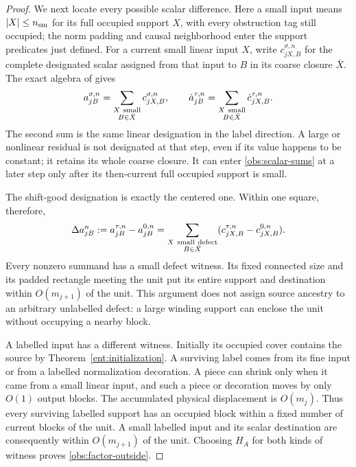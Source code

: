 \begin{proof}
We next locate every possible scalar difference.  Here a small
input means \(|X|\le n_{\rm sm}\) for its full occupied support
\(X\), with every obstruction tag still occupied; the norm padding
and causal neighborhood enter the support predicates just defined.
For a current small linear input \(X\), write
\(c_{jX,B}^{\sigma,n}\) for the complete designated scalar assigned
from that input to \(B\) in its coarse closure \(\bar X\).
The exact algebra of \cite[Proposition~4.8]{B} gives
\begin{equation}\label{obs:scalar-sums}
 a_{jB}^{\sigma,n}
       =\sum_{\substack{X\ {\rm small}\\B\in\bar X}}
                      c_{jX,B}^{\sigma,n},\qquad
 \dot a_{jB}^{\tau,n}
       =\sum_{\substack{X\ {\rm small}\\B\in\bar X}}
                      \dot c_{jX,B}^{\tau,n}.
\end{equation}
The second sum is the same linear designation in the label direction.
A large or nonlinear residual is not designated at that step, even
if its value happens to be constant; it retains its whole coarse
closure.  It can enter \eqref{obs:scalar-sums} at a later step only
after its then-current full occupied support is small.

The shift-good designation is exactly the centered one.  Within
one square, therefore,
\begin{equation}\label{obs:scalar-difference}
 \Delta a_{jB}^n:=a_{jB}^{\tau,n}-a_{jB}^{0,n}
   =\sum_{\substack{X\ {\rm small\ defect}\\B\in\bar X}}
             (c_{jX,B}^{\tau,n}-c_{jX,B}^{0,n}).
\end{equation}
Every nonzero summand has a small defect witness.  Its fixed connected
size and its padded rectangle meeting the unit put its entire support
and destination within \(O(m_{j+1})\) of the unit.  This argument
does not assign source ancestry to an arbitrary unlabelled defect:
a large winding support can enclose the unit without occupying a
nearby block.

A labelled input has a different witness.  Initially its occupied
cover contains the source by Theorem~\ref{ent:initialization}.  A
surviving label comes from its fine input or from a labelled
normalization decoration.  A piece can shrink only when it came
from a small linear input, and such a piece or decoration moves by
only \(O(1)\) output blocks.  The accumulated physical displacement
is \(O(m_j)\).  Thus every surviving labelled support has an occupied
block within a fixed number of current blocks of the unit.  A small
labelled input and its scalar destination are consequently within
\(O(m_{j+1})\) of the unit.  Choosing \(H_A\) for both kinds of
witness proves \eqref{obs:factor-outside}.


\end{proof}
